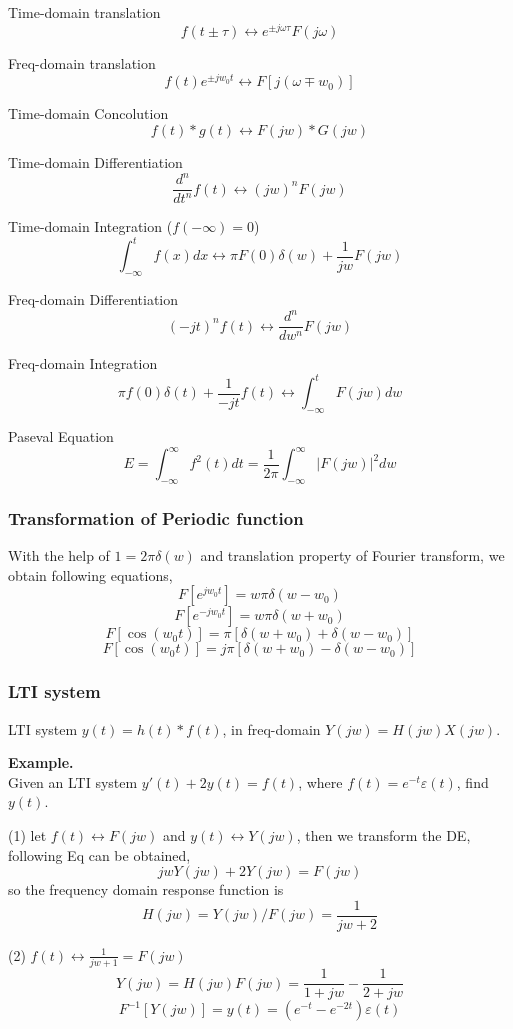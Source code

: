  Time-domain translation
 \[ f(t\pm \tau) \leftrightarrow e^{\pm j\omega \tau}F(j\omega) \]

 Freq-domain translation
 \[ f(t)e^{\pm jw_0t} \leftrightarrow F[j(\omega \mp w_0)] \]

 Time-domain Concolution
 \[ f(t)*g(t) \leftrightarrow F(jw)*G(jw)\]

 Time-domain Differentiation
 \[ \frac{d^n}{dt^n}f(t) \leftrightarrow (jw)^n F(jw)\]

 Time-domain Integration ($f(-\infty) = 0$)
 \[ \int^t_{-\infty} f(x)dx \leftrightarrow \pi F(0)\delta(w) + \frac{1}{jw}F(jw)\]

 Freq-domain Differentiation
 \[ (-jt)^n f(t) \leftrightarrow \frac{d^n}{dw^n} F(jw)\]

 Freq-domain Integration
 \[ \pi f(0)\delta(t) + \frac{1}{-jt}f(t) \leftrightarrow \int^t_{-\infty} F(jw)dw\]

 Paseval Equation
 \[ E = \int_{-\infty}^\infty f^2(t)dt = \frac{1}{2\pi} \int_{-\infty}^\infty |F(jw)|^2 dw\]

 \subsubsection{Transformation of Periodic function}
 With the help of $\mathcal{1} = 2\pi \delta(w)$ and translation property of Fourier transform,
 we obtain following equations,
 \[ \mathit{F}[e^{jw_0t}] = w\pi \delta(w - w_0) \]
 \[ \mathit{F}[e^{-jw_0t}] = w\pi \delta(w + w_0) \]
 \[ \mathit{F}[\cos(w_0t)] = \pi [\delta(w+w_0) + \delta(w-w_0)] \]
 \[ \mathit{F}[\cos(w_0t)] = j\pi [\delta(w+w_0) - \delta(w-w_0)] \]

 \subsubsection{LTI system}
 LTI system $y(t) = h(t) * f(t)$, in freq-domain $Y(jw)=H(jw)X(jw)$.

 {\bf Example.}\\
 Given an LTI system $y'(t) + 2y(t) = f(t)$, where $f(t) = e^{-t}\varepsilon(t)$, find $y(t)$.

 (1) let $f(t) \leftrightarrow F(jw)$ and $y(t) \leftrightarrow Y(jw)$, then
 we transform the DE, following Eq can be obtained,
 \[ jw Y(jw) + 2Y(jw) = F(jw)\]
 so the frequency domain response function is
 \[ H(jw) = Y(jw)/F(jw) = \frac{1}{jw +2}\]

 (2) $f(t) \leftrightarrow \frac{1}{jw +1} = F(jw)$
 \[ Y(jw) = H(jw)F(jw) = \frac{1}{1+jw} - \frac{1}{2+jw} \]
 \[ \mathit{F}^{-1}[Y(jw)] = y(t) = (e^{-t} - e^{-2t})\varepsilon(t)\]

